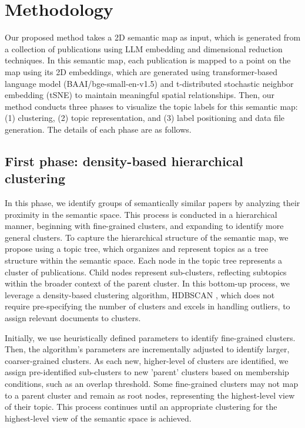 \documentclass{vgtc}                          %
\begin{document}
\section{Methodology}

Our proposed method takes a 2D semantic map as input, which is generated from a collection of publications using LLM embedding and dimensional reduction techniques. In this semantic map, each publication is mapped to a point on the map using its 2D embeddings, which are generated using transformer-based language model \cite{BAAI2023} (BAAI/bge-small-en-v1.5) and t-distributed stochastic neighbor embedding (tSNE) \cite{vanderMaaten2008} to maintain meaningful spatial relationships. Then, our method conducts three phases to visualize the topic labels for this semantic map: (1) clustering, (2) topic representation, and (3) label positioning and data file generation. The details of each phase are as follows.

\subsection{First phase: density-based hierarchical clustering}

In this phase, we identify groups of semantically similar papers by analyzing their proximity in the semantic space. This process is conducted in a hierarchical manner, beginning with fine-grained clusters, and expanding to identify more general clusters. To capture the hierarchical structure of the semantic map, we propose using a topic tree, which organizes and represent topics as a tree structure within the semantic space. Each node in the topic tree represents a cluster of publications. Child nodes represent sub-clusters, reflecting subtopics within the broader context of the parent cluster. In this bottom-up process, we leverage a density-based clustering algorithm, HDBSCAN \cite{McInnes2017}, which does not require pre-specifying the number of clusters and excels in handling outliers, to assign relevant documents to clusters.

Initially, we use heuristically defined parameters to identify fine-grained clusters. Then, the algorithm’s parameters are incrementally adjusted to identify larger, coarser-grained clusters. As each new, higher-level of clusters are identified, we assign pre-identified sub-clusters to new 'parent' clusters based on membership conditions, such as an overlap threshold. Some fine-grained clusters may not map to a parent cluster and remain as root nodes, representing the highest-level view of their topic. This process continues until an appropriate clustering for the highest-level view of the semantic space is achieved.
\end{document}
